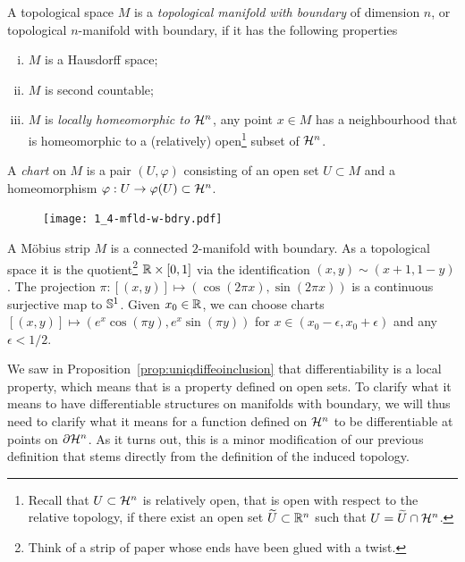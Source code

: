\begin{definition}
  A topological space $M$ is a \emph{topological manifold with boundary} of dimension $n$, or topological $n$-manifold with boundary, if it has the following properties
  \begin{enumerate}[(i)]
    \item $M$ is a Hausdorff space;
    \item $M$ is second countable;
    \item $M$ is \emph{locally homeomorphic to $\mathcal{H}^n$}, any point $x\in M$ has a neighbourhood that is homeomorphic to a (relatively) open\footnote{Recall that $U\subset\mathcal{H}^n$ is relatively open, that is open with respect to the relative topology, if there exist an open set $\widetilde U\subset\mathbb{R}^n$ such that $U = \widetilde U \cap \mathcal{H}^n$.} subset of $\mathcal{H}^n$.
  \end{enumerate}

  A \emph{chart} on $M$ is a pair $(U, \varphi)$ consisting of an open set $U\subset M$ and a homeomorphism $\varphi: U \to \varphi(U)\subset \mathcal{H}^n$.
\end{definition}

\begin{figure}
  \texttt{[image: 1\_4-mfld-w-bdry.pdf]}
\end{figure}

\begin{example}\label{ex:mobius}
A M\"obius strip $M$ is a connected $2$-manifold with boundary.
As a topological space it is the quotient\footnote{Think of a strip of paper whose ends have been glued with a twist.} $\mathbb{R}\times[0,1]$ via the identification $(x,y)\sim(x+1, 1-y)$.
The projection $\pi: [(x,y)] \mapsto (\cos(2\pi x), \sin(2\pi x))$ is a continuous surjective map to $\mathbb{S}^1$.
Given $x_0\in\mathbb{R}$, we can choose charts $[(x,y)]\mapsto (e^x\cos(\pi y), e^x\sin(\pi y))$ for $x\in(x_0 - \epsilon, x_0 + \epsilon)$ and any $\epsilon < 1/2$.
\end{example}

We saw in Proposition~\ref{prop:uniqdiffeoinclusion} that differentiability is a local property, which means that is a property defined on open sets.
To clarify what it means to have differentiable structures on manifolds with boundary, we will thus need to clarify what it means for a function defined on $\mathcal{H}^n$ to be differentiable at points on $\partial\mathcal{H}^n$.
As it turns out, this is a minor modification of our previous definition that stems directly from the definition of the induced topology.

